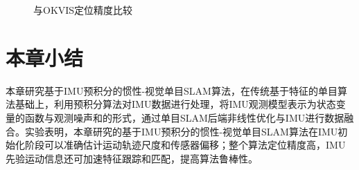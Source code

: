 \begin{figure}[H]
    \centering
     \caption{与OKVIS定位精度比较}
\label{fig5.4}
\end{figure}   



\section{本章小结}
本章研究基于IMU预积分的惯性-视觉单目SLAM算法，在传统基于特征的单目算法基础上，利用预积分算法对IMU数据进行处理，将IMU观测模型表示为状态变量的函数与观测噪声和的形式，通过单目SLAM后端非线性优化与IMU进行数据融合。实验表明，本章研究的基于IMU预积分的惯性-视觉单目SLAM算法在IMU初始化阶段可以准确估计运动轨迹尺度和传感器偏移；整个算法定位精度高，IMU先验运动信息还可加速特征跟踪和匹配，提高算法鲁棒性。




